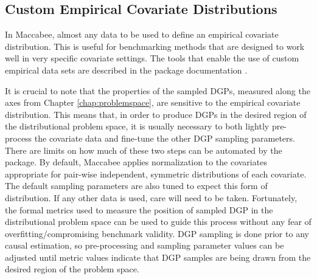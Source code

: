 \documentclass[../main.tex]{subfiles}
\begin{document}
\subsection{Custom Empirical Covariate Distributions}

 In Maccabee, almost any data to be used to define an empirical covariate distribution. This is useful for benchmarking methods that are designed to work well in very specific covariate settings. The tools that enable the use of custom empirical data sets are described in the package documentation .

 \vspace{\baselineskip}

 It is crucial to note that the properties of the sampled DGPs, measured along the axes from Chapter \ref{chap:problemspace}, are sensitive to the empirical covariate distribution. This means that, in order to produce DGPs in the desired region of the distributional problem space, it is usually necessary to both lightly pre-process the covariate data and fine-tune the other DGP sampling parameters. There are limits on how much of these two steps can be automated by the package. By default, Maccabee applies normalization to the covariates appropriate for pair-wise independent, symmetric distributions of each covariate. The default sampling parameters are also tuned to expect this form of distribution. If any other data is used, care will need to be taken. Fortunately, the formal metrics used to measure the position of sampled DGP in the distributional problem space can be used to guide this process without any fear of overfitting/compromising benchmark validity. DGP sampling is done prior to any causal estimation, so pre-processing and sampling parameter values can be adjusted until metric values indicate that DGP samples are being drawn from the desired region of the problem space.
\end{document}
